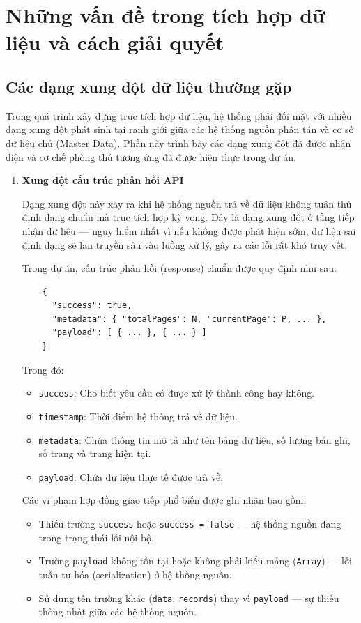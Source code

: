 \newpage
\section{Những vấn đề trong tích hợp dữ liệu và cách giải quyết}
\subsection{Các dạng xung đột dữ liệu thường gặp}
Trong quá trình xây dựng trục tích hợp dữ liệu, hệ thống phải đối mặt với nhiều dạng xung đột phát sinh tại ranh giới giữa các hệ thống nguồn phân tán và cơ sở dữ liệu chủ (Master Data). Phần này trình bày các dạng xung đột đã được nhận diện và cơ chế phòng thủ tương ứng đã được hiện thực trong dự án.

\begin{enumerate}
    \item \textbf{Xung đột cấu trúc phản hồi API}

    Dạng xung đột này xảy ra khi hệ thống nguồn trả về dữ liệu không tuân thủ định dạng chuẩn mà trục tích hợp kỳ vọng. Đây là dạng xung đột ở tầng tiếp nhận dữ liệu --- nguy hiểm nhất vì nếu không được phát hiện sớm, dữ liệu sai định dạng sẽ lan truyền sâu vào luồng xử lý, gây ra các lỗi rất khó truy vết.

    Trong dự án, cấu trúc phản hồi (response) chuẩn được quy định như sau:

    \begin{verbatim}
    {
      "success": true,
      "metadata": { "totalPages": N, "currentPage": P, ... },
      "payload": [ { ... }, { ... } ]
    }
    \end{verbatim}

    Trong đó:

    \begin{itemize}
        \item \texttt{success}: Cho biết yêu cầu có được xử lý thành công hay không.
        \item \texttt{timestamp}: Thời điểm hệ thống trả về dữ liệu.
        \item \texttt{metadata}: Chứa thông tin mô tả như tên bảng dữ liệu, số lượng bản ghi, số trang và trang hiện tại.
        \item \texttt{payload}: Chứa dữ liệu thực tế được trả về.
    \end{itemize}
    
    Các vi phạm hợp đồng giao tiếp phổ biến được ghi nhận bao gồm:
    
    \begin{itemize}
        \item Thiếu trường \texttt{success} hoặc \texttt{success = false} --- hệ thống nguồn đang trong trạng thái lỗi nội bộ.
        \item Trường \texttt{payload} không tồn tại hoặc không phải kiểu mảng (\texttt{Array}) --- lỗi tuần tự hóa (serialization) ở hệ thống nguồn.
        \item Sử dụng tên trường khác (\texttt{data}, \texttt{records}) thay vì \texttt{payload} --- sự thiếu thống nhất giữa các hệ thống nguồn.
    \end{itemize}
    

\end{enumerate}
